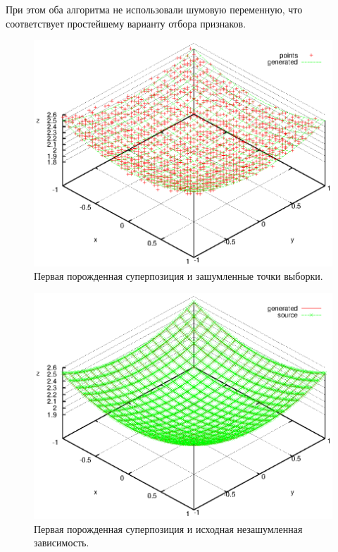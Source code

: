 \documentclass[12pt,a4paper]{article}
\begin{document}
При этом оба алгоритма не использовали шумовую переменную, что соответствует
простейшему варианту отбора признаков.

\begin{figure}[h]
  \centering
  \includegraphics[scale=1.1]{figs/1-data.eps}
  \caption{Первая порожденная суперпозиция и зашумленные точки выборки.}
  \label{fig:1_data}
\end{figure}

\begin{figure}[h]
  \centering
  \includegraphics[scale=1.1]{figs/1-source.eps}
  \caption{Первая порожденная суперпозиция и исходная незашумленная зависимость.}
  \label{fig:1_source}
\end{figure}
\end{document}

